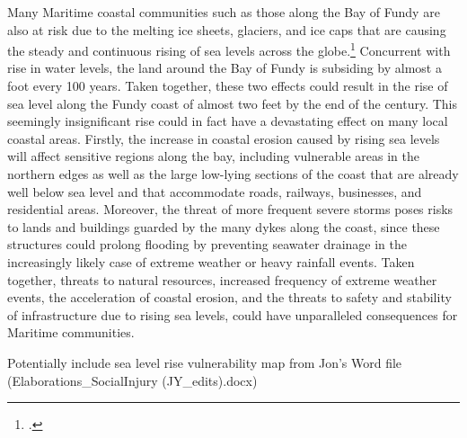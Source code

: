Many Maritime coastal communities such as those along the Bay of Fundy are also at risk due to the melting ice sheets, glaciers, and ice caps that are causing the steady and continuous rising of sea levels across the globe.\footcite[][]{PercyRisingTide}
Concurrent with rise in water levels, the land around the Bay of Fundy is subsiding by almost a foot every 100 years.
Taken together, these two effects could result in the rise of sea level along the Fundy coast of almost two feet by the end of the century.
This seemingly insignificant rise could in fact have a devastating effect on many local coastal areas.
Firstly, the increase in coastal erosion caused by rising sea levels will affect sensitive regions along the bay, including vulnerable areas in the northern edges as well as the large low-lying sections of the coast that are already well below sea level and that accommodate roads, railways, businesses, and residential areas. 
Moreover, the threat of more frequent severe storms poses risks to lands and buildings guarded by the many dykes along the coast, since these structures could prolong flooding by preventing seawater drainage in the increasingly likely case of extreme weather or heavy rainfall events. 
Taken together, threats to natural resources, increased frequency of extreme weather events, the acceleration of coastal erosion, and the threats to safety and stability of infrastructure due to rising sea levels, could have unparalleled consequences for Maritime communities. 

\begin{vcom}		
Potentially include sea level rise vulnerability map from Jon's Word file (Elaborations_SocialInjury (JY_edits).docx)
\end{vcom}

